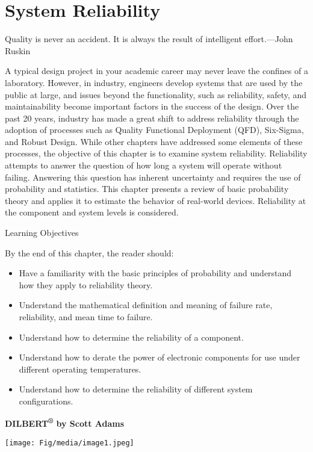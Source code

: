 \section{System Reliability}\label{system-reliability}

Quality is never an accident. It is always the result of intelligent
effort.---John Ruskin

A typical design project in your academic career may never leave the
confines of a laboratory. However, in industry, engineers develop
systems that are used by the public at large, and issues beyond the
functionality, such as reliability, safety, and maintainability become
important factors in the success of the design. Over the past 20 years,
industry has made a great shift to address reliability through the
adoption of processes such as Quality Functional Deployment (QFD),
Six-Sigma, and Robust Design. While other chapters have addressed some
elements of these processes, the objective of this chapter is to examine
system reliability. Reliability attempts to answer the question of how
long a system will operate without failing. Answering this question has
inherent uncertainty and requires the use of probability and statistics.
This chapter presents a review of basic probability theory and applies
it to estimate the behavior of real-world devices. Reliability at the
component and system levels is considered.

Learning Objectives

By the end of this chapter, the reader should:

\begin{itemize}
\item
  Have a familiarity with the basic principles of probability and
  understand how they apply to reliability theory.
\item
  Understand the mathematical definition and meaning of failure rate,
  reliability, and mean time to failure.
\item
  Understand how to determine the reliability of a component.
\item
  Understand how to derate the power of electronic components for use
  under different operating temperatures.
\item
  Understand how to determine the reliability of different system
  configurations.
\end{itemize}

\textbf{\hfill\break
DILBERT\textsuperscript{®} by Scott Adams}

\texttt{[image: Fig/media/image1.jpeg]}

